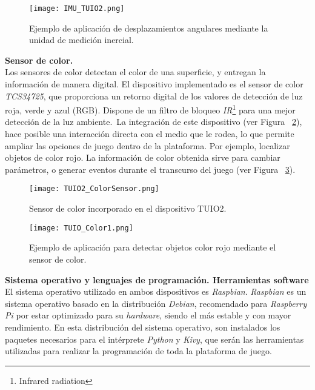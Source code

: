 \begin{figure}[!h]
\begin{center}
\texttt{[image: IMU\_TUIO2.png]}
\caption{Ejemplo de aplicación de desplazamientos angulares mediante la unidad de medición inercial.}
\label{fig:IMU_TUIO2}
\end{center}
\end{figure}


\textbf{Sensor de color.}\\
Los sensores de color detectan el color de una superficie, y entregan la información de manera digital.
El dispositivo implementado es el sensor de color \emph{TCS34725}, que proporciona un retorno digital de los valores de detección de luz roja, verde y azul (RGB). Dispone de un filtro de bloqueo \emph{IR}\footnote{Infrared radiation} para una mejor detección de la luz ambiente.\
La integración de este dispositivo (ver Figura ~\ref{fig:TUIO2_ColorSensor}), hace posible una interacción directa con el medio que le rodea, lo que permite ampliar las opciones de juego dentro de la plataforma. Por ejemplo, localizar objetos de color rojo. La información de color obtenida sirve para cambiar parámetros, o generar eventos durante el transcurso del juego (ver Figura ~\ref{fig:TUIO_Color1}).

\begin{figure}[!h]
\begin{center}
\texttt{[image: TUIO2\_ColorSensor.png]}
\caption{Sensor de color incorporado en el dispositivo TUIO2.}
\label{fig:TUIO2_ColorSensor}
\end{center}
\end{figure}


\begin{figure}[!h]
\begin{center}
\texttt{[image: TUIO\_Color1.png]}
\caption{Ejemplo de aplicación para detectar objetos color rojo mediante el sensor de color.}
\label{fig:TUIO_Color1}
\end{center}
\end{figure}



\textbf{Sistema operativo y lenguajes de programación. Herramientas software}
El sistema operativo utilizado en ambos dispositivos es \emph{Raspbian}.
\emph{Raspbian} es un sistema operativo basado en la distribución \emph{Debian}, recomendado para \emph{Raspberry Pi} por estar optimizado para su \emph{hardware}, siendo el más estable y con mayor rendimiento.
En esta distribución del sistema operativo, son instalados los paquetes necesarios para el intérprete \emph{Python} y \emph{Kivy}, que serán las herramientas utilizadas para realizar la programación de toda la plataforma de juego.


